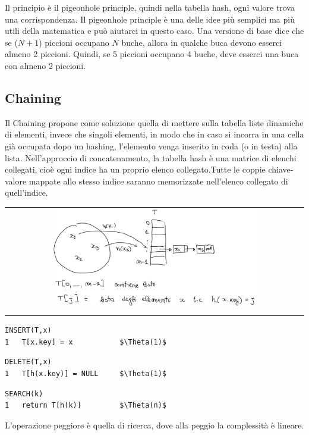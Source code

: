 Il principio è il pigeonhole principle, quindi nella tabella hash, ogni valore trova una corrispondenza. 
Il pigeonhole principle è una delle idee più semplici ma più utili della matematica e può aiutarci in questo caso. 
Una versione di base dice che se ($N+1$) piccioni occupano $N$ buche, allora in qualche buca devono esserci almeno 2 piccioni. 
Quindi, se 5 piccioni occupano 4 buche, deve esserci una buca con almeno 2 piccioni.

\subsection{Chaining}
Il Chaining propone come soluzione quella di mettere sulla tabella liste dinamiche di elementi, invece che singoli elementi, in modo che in caso si incorra in una cella già occupata dopo un hashing, l'elemento venga inserito in coda (o in testa) alla lista. Nell'approccio di concatenamento, la tabella hash è una matrice di elenchi collegati, cioè ogni indice ha un proprio elenco collegato.Tutte le coppie chiave-valore mappate allo stesso indice saranno memorizzate nell'elenco collegato di quell'indice.

\begin{center}
    \begin{tabular}{c}
        \\ \includegraphics[width=0.7\textwidth]{image/Chaining.png} \\ \\
    \end{tabular}
\end{center}

\newpage
\begin{mdframed}
\begin{lstlisting}[mathescape=true]
INSERT(T,x)
1   T[x.key] = x           $\Theta(1)$
\end{lstlisting}
\end{mdframed}
\begin{mdframed}
\begin{lstlisting}[mathescape=true]
DELETE(T,x)
1   T[h(x.key)] = NULL     $\Theta(1)$
\end{lstlisting}
\end{mdframed}
\begin{mdframed}
\begin{lstlisting}[mathescape=true]
SEARCH(k)
1   return T[h(k)]         $\Theta(n)$
\end{lstlisting}
\end{mdframed}
L'operazione peggiore è quella di ricerca, dove alla peggio la complessità è lineare.
